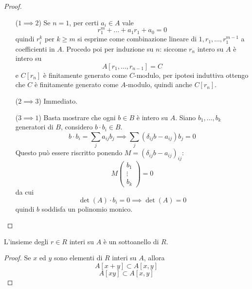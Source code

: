\begin{proof}\
	\begin{itemize}
		\item[($1\implies 2$)] Se $n=1$, per certi $a_i\in A$ vale 
		\begin{equation*}
		r_1^m+\dots+a_1r_1+a_0=0
		\end{equation*}
		quindi $r_i^k$ per $k\geq m$ si esprime come combinazione lineare di $1,r_1,\dots,r_1^{m-1}$ a coefficienti in $A$. Procedo poi per induzione su $n$: siccome $r_n$ intero su $A$ è intero su 
		\begin{equation*}
			A[r_1,\dots,r_{n-1}]=C
		\end{equation*}
		e $C[r_n]$ è finitamente generato come $C$-modulo, per ipotesi induttiva ottengo che $C$ è finitamente generato come $A$-modulo, quindi anche $C[r_n]$.
		\item[($2\implies 3$)] Immediato.
		\item[($3\implies 1$)] Basta mostrare che ogni $b\in B$ è intero su $A$. Siano $b_1,\dots,b_k$ generatori di $B$, considero $b\cdot b_i \in B$.
		\begin{equation*}
		 b\cdot b_i = \sum_j a_{ij}b_j \implies \sum_j(\delta_{ij}b-a_{ij})b_j=0
		\end{equation*}
		Questo può essere riscritto ponendo $M=(\delta_{ij}b-a_{ij})_{ij}$:
		\begin{equation*}
		M
		\begin{pmatrix}
		b_1\\ \vdots \\ b_k
		\end{pmatrix}
		=0
		\end{equation*}
		da cui
		\begin{equation*}
		\det(A)\cdot b_i=0 \implies \det(A)=0
		\end{equation*}
		quindi $b$ soddisfa un polinomio monico.
	\end{itemize}
\end{proof}
\begin{corollario}
	L'insieme degli $r\in R$ interi su $A$ è un sottoanello di $R$.
\end{corollario}
\begin{proof}
	Se $x$ ed $y$ sono elementi di $R$ interi su $A$, allora 
	\begin{equation*}
	A[x+y]\subset A[x,y]
	\end{equation*}
	\begin{equation*}
	A[xy]\subset A[x,y]
	\end{equation*}
\end{proof}




